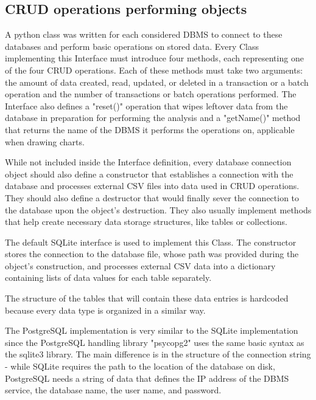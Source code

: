 \subsection{CRUD operations performing objects}
\par A python class was written for each considered DBMS to connect to these databases and perform basic operations on stored data. Every Class implementing this Interface must introduce four methods, each representing one of the four CRUD operations. Each of these methods must take two arguments: the amount of data created, read, updated, or deleted in a transaction or a batch operation and the number of transactions or batch operations performed. The Interface also defines a "reset()" operation that wipes leftover data from the database in preparation for performing the analysis and a "getName()" method that returns the name of the DBMS it performs the operations on, applicable when drawing charts.

\par While not included inside the Interface definition, every database connection object should also define a constructor that establishes a connection with the database and processes external CSV files into data used in CRUD operations. They should also define a destructor that would finally sever the connection to the database upon the object's destruction. They also usually implement methods that help create necessary data storage structures, like tables or collections.

\par The default SQLite interface is used to implement this Class. The constructor stores the connection to the database file, whose path was provided during the object's construction, and processes external CSV data into a dictionary containing lists of data values for each table separately. 
\par The structure of the tables that will contain these data entries is hardcoded because every data type is organized in a similar way.

\par The PostgreSQL implementation is very similar to the SQLite implementation since the PostgreSQL handling library "psycopg2" uses the same basic syntax as the sqlite3 library. The main difference is in the structure of the connection string - while SQLite requires the path to the location of the database on disk, PostgreSQL needs a string of data that defines the IP address of the DBMS service, the database name, the user name, and password. 
